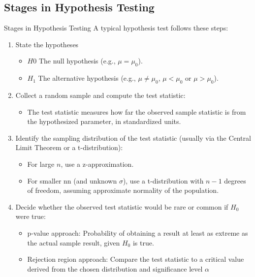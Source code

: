 \documentclass[10pt, total={6in, 8in}]{extarticle}
\begin{document}
\subsection{Stages in Hypothesis Testing}
\begin{conceptbox}{Stages in Hypothesis Testing}{}
    A typical hypothesis test follows these steps:
    \begin{enumerate}
        \item State the hypotheses
              \begin{itemize}
                  \item $H0$ The null hypothesis (e.g., $\mu = \mu_0$).
                  \item $H_1$ The alternative hypothesis (e.g., $\mu \neq \mu_0$, $\mu < \mu_0$ or $\mu > \mu_0$).
              \end{itemize}
        \item  Collect a random sample and compute the test statistic:
              \begin{itemize}
                  \item The test statistic measures how far the observed sample statistic is from the hypothesized parameter, in standardized units.
              \end{itemize}
        \item Identify the sampling distribution of the test statistic (usually via the Central Limit Theorem or a t-distribution):
              \begin{itemize}
                  \item For large $n$, use a z-approximation.
                  \item For smaller nn (and unknown $\sigma$), use a t-distribution with $n-1$ degrees of freedom, assuming approximate normality of the population.
              \end{itemize}
        \item Decide whether the observed test statistic would be rare or common if $H_0$ were true:
              \begin{itemize}
                  \item p-value approach: Probability of obtaining a result at least as extreme as the actual sample result, given $H_0$ is true.
                  \item Rejection region approach: Compare the test statistic to a critical value derived from the chosen distribution and significance level $\alpha$
              \end{itemize}

\end{enumerate}
\end{conceptbox}
\end{document}
